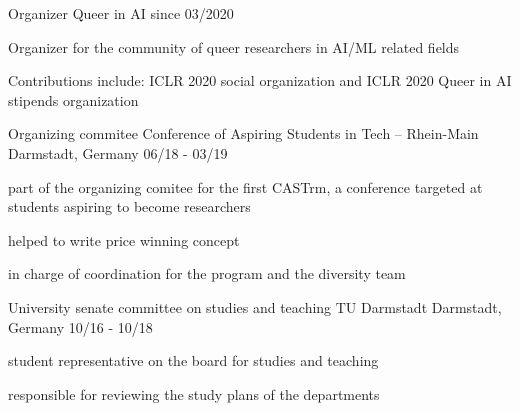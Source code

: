 

\begin{cventries}
  \cventry
    {Organizer} %
	{Queer in AI} %
	{} %
    {since 03/2020} %
    {
      \begin{cvitems} %
        \item {Organizer for the community of queer researchers in AI/ML related fields}
        \item {Contributions include: ICLR 2020 social organization and ICLR 2020 Queer in AI stipends organization}
      \end{cvitems}
    }

  \cventry
    {Organizing commitee} %
    {Conference of Aspiring Students in Tech -- Rhein-Main} %
    {Darmstadt, Germany} %
    {06/18 - 03/19} %
    {
      \begin{cvitems} %
        \item {part of the organizing comitee for the first CASTrm, a conference targeted at students aspiring to become researchers}
        \item {helped to write price winning concept}
        \item {in charge of coordination for the program and the diversity team}
      \end{cvitems}
    }

  \cventry
    {University senate committee on studies and teaching} %
    {TU Darmstadt} %
    {Darmstadt, Germany} %
    {10/16 - 10/18} %
    {
      \begin{cvitems} %
        \item {student representative on the board for studies and teaching}
        \item {responsible for reviewing the study plans of the departments}
      \end{cvitems}
    }


\end{cventries}
